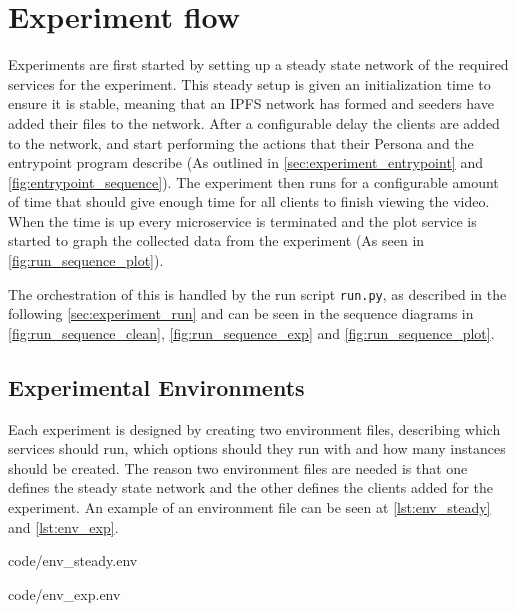 \section{Experiment flow}
\label{sec:impl-flow}
Experiments are first started by setting up a steady state network of the required services for the experiment. This steady setup is given an initialization time to ensure it is stable, meaning that an \ac{IPFS} network has formed and seeders have added their files to the network.
After a configurable delay the clients are added to the network, and start performing the actions that their Persona and the entrypoint program describe (As outlined in \autoref{sec:experiment_entrypoint} and \autoref{fig:entrypoint_sequence}).
The experiment then runs for a configurable amount of time that should give enough time for all clients to finish viewing the video. When the time is up every microservice is terminated and the plot service is started to graph the collected data from the experiment (As seen in \autoref{fig:run_sequence_plot}).

The orchestration of this is handled by the run script \texttt{run.py}, as described in the following \autoref{sec:experiment_run} and can be seen in the sequence diagrams in \autoref{fig:run_sequence_clean}, \ref{fig:run_sequence_exp} and \ref{fig:run_sequence_plot}.

\subsection{Experimental Environments}
\label{sec:experiment_env}
Each experiment is designed by creating two environment files, describing which services should run, which options should they run with and how many instances should be created. The reason two environment files are needed is that one defines the steady state network and the other defines the clients added for the experiment. An example of an environment file can be seen at \autoref{lst:env_steady} and \ref{lst:env_exp}.

\noindent\begin{minipage}[t]{.40\textwidth}

                {code/env_steady.env}
\end{minipage}
\hfill
\begin{minipage}[t]{.51\textwidth}

                {code/env_exp.env}
\end{minipage}\bigskip

